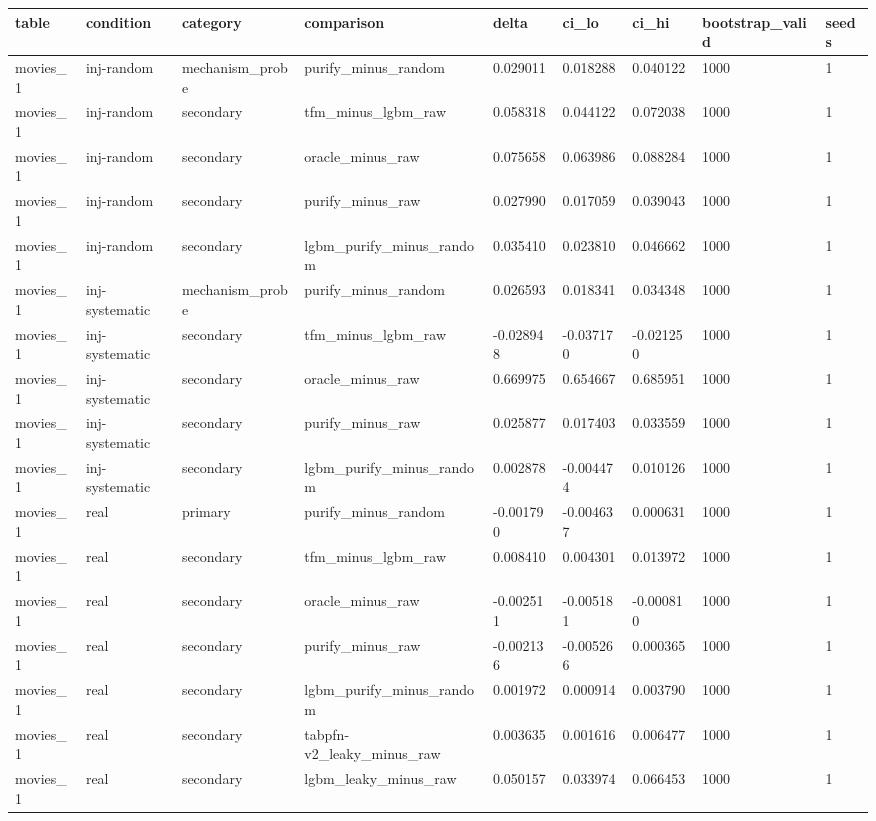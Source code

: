 \begin{tabular}{lllllllll}
\hline
table & condition & category & comparison & delta & ci\_lo & ci\_hi & bootstrap\_valid & seeds \\
\hline
movies\_1 & inj-random & mechanism\_probe & purify\_minus\_random & 0.029011 & 0.018288 & 0.040122 & 1000 & 1 \\
movies\_1 & inj-random & secondary & tfm\_minus\_lgbm\_raw & 0.058318 & 0.044122 & 0.072038 & 1000 & 1 \\
movies\_1 & inj-random & secondary & oracle\_minus\_raw & 0.075658 & 0.063986 & 0.088284 & 1000 & 1 \\
movies\_1 & inj-random & secondary & purify\_minus\_raw & 0.027990 & 0.017059 & 0.039043 & 1000 & 1 \\
movies\_1 & inj-random & secondary & lgbm\_purify\_minus\_random & 0.035410 & 0.023810 & 0.046662 & 1000 & 1 \\
movies\_1 & inj-systematic & mechanism\_probe & purify\_minus\_random & 0.026593 & 0.018341 & 0.034348 & 1000 & 1 \\
movies\_1 & inj-systematic & secondary & tfm\_minus\_lgbm\_raw & -0.028948 & -0.037170 & -0.021250 & 1000 & 1 \\
movies\_1 & inj-systematic & secondary & oracle\_minus\_raw & 0.669975 & 0.654667 & 0.685951 & 1000 & 1 \\
movies\_1 & inj-systematic & secondary & purify\_minus\_raw & 0.025877 & 0.017403 & 0.033559 & 1000 & 1 \\
movies\_1 & inj-systematic & secondary & lgbm\_purify\_minus\_random & 0.002878 & -0.004474 & 0.010126 & 1000 & 1 \\
movies\_1 & real & primary & purify\_minus\_random & -0.001790 & -0.004637 & 0.000631 & 1000 & 1 \\
movies\_1 & real & secondary & tfm\_minus\_lgbm\_raw & 0.008410 & 0.004301 & 0.013972 & 1000 & 1 \\
movies\_1 & real & secondary & oracle\_minus\_raw & -0.002511 & -0.005181 & -0.000810 & 1000 & 1 \\
movies\_1 & real & secondary & purify\_minus\_raw & -0.002136 & -0.005266 & 0.000365 & 1000 & 1 \\
movies\_1 & real & secondary & lgbm\_purify\_minus\_random & 0.001972 & 0.000914 & 0.003790 & 1000 & 1 \\
movies\_1 & real & secondary & tabpfn-v2\_leaky\_minus\_raw & 0.003635 & 0.001616 & 0.006477 & 1000 & 1 \\
movies\_1 & real & secondary & lgbm\_leaky\_minus\_raw & 0.050157 & 0.033974 & 0.066453 & 1000 & 1 \\
\hline
\end{tabular}
